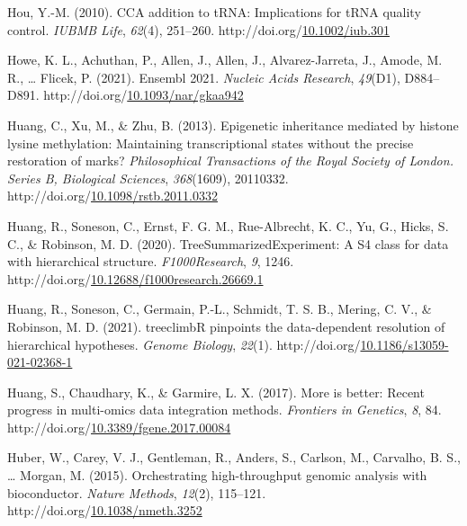 \documentclass[12pt,twoside]{reedthesis}
\newlength{\cslhangindent}
\newenvironment{CSLReferences}[2] %
 {%
  \setlength{\parindent}{0pt}
  \ifodd #1 \everypar{\setlength{\hangindent}{\cslhangindent}}\ignorespaces\fi
  \ifnum #2 > 0
  \setlength{\parskip}{#2\baselineskip}
  \fi
 }%
 {}
\begin{document}
\begin{CSLReferences}{1}{0}
\leavevmode{}%
Hou, Y.-M. (2010). CCA addition to tRNA: Implications for tRNA quality control. \emph{IUBMB Life}, \emph{62}(4), 251--260. http://doi.org/\href{https://doi.org/10.1002/iub.301}{10.1002/iub.301}

\leavevmode{}%
Howe, K. L., Achuthan, P., Allen, J., Allen, J., Alvarez-Jarreta, J., Amode, M. R., \ldots{} Flicek, P. (2021). Ensembl 2021. \emph{Nucleic Acids Research}, \emph{49}(D1), D884--D891. http://doi.org/\href{https://doi.org/10.1093/nar/gkaa942}{10.1093/nar/gkaa942}

\leavevmode{}%
Huang, C., Xu, M., \& Zhu, B. (2013). Epigenetic inheritance mediated by histone lysine methylation: Maintaining transcriptional states without the precise restoration of marks? \emph{Philosophical Transactions of the Royal Society of London. Series B, Biological Sciences}, \emph{368}(1609), 20110332. http://doi.org/\href{https://doi.org/10.1098/rstb.2011.0332}{10.1098/rstb.2011.0332}

\leavevmode{}%
Huang, R., Soneson, C., Ernst, F. G. M., Rue-Albrecht, K. C., Yu, G., Hicks, S. C., \& Robinson, M. D. (2020). TreeSummarizedExperiment: A S4 class for data with hierarchical structure. \emph{F1000Research}, \emph{9}, 1246. http://doi.org/\href{https://doi.org/10.12688/f1000research.26669.1}{10.12688/f1000research.26669.1}

\leavevmode{}%
Huang, R., Soneson, C., Germain, P.-L., Schmidt, T. S. B., Mering, C. V., \& Robinson, M. D. (2021). treeclimbR pinpoints the data-dependent resolution of hierarchical hypotheses. \emph{Genome Biology}, \emph{22}(1). http://doi.org/\href{https://doi.org/10.1186/s13059-021-02368-1}{10.1186/s13059-021-02368-1}

\leavevmode{}%
Huang, S., Chaudhary, K., \& Garmire, L. X. (2017). More is better: Recent progress in multi-omics data integration methods. \emph{Frontiers in Genetics}, \emph{8}, 84. http://doi.org/\href{https://doi.org/10.3389/fgene.2017.00084}{10.3389/fgene.2017.00084}

\leavevmode{}%
Huber, W., Carey, V. J., Gentleman, R., Anders, S., Carlson, M., Carvalho, B. S., \ldots{} Morgan, M. (2015). Orchestrating high-throughput genomic analysis with bioconductor. \emph{Nature Methods}, \emph{12}(2), 115--121. http://doi.org/\href{https://doi.org/10.1038/nmeth.3252}{10.1038/nmeth.3252}


\end{CSLReferences}
\end{document}
